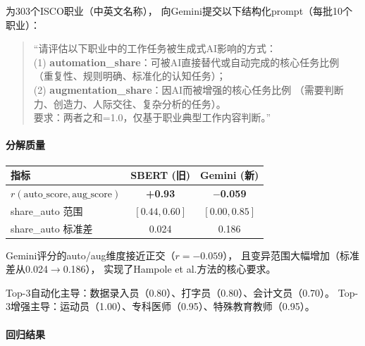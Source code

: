 \documentclass[12pt,a4paper]{ctexart}
\begin{document}
为303个ISCO职业（中英文名称），
向Gemini提交以下结构化prompt（每批10个职业）：

\begin{quote}
\small
``请评估以下职业中的工作任务被生成式AI影响的方式：\\
(1) \textbf{automation\_share}：可被AI直接替代或自动完成的核心任务比例
（重复性、规则明确、标准化的认知任务）；\\
(2) \textbf{augmentation\_share}：因AI而被增强的核心任务比例
（需要判断力、创造力、人际交往、复杂分析的任务）。\\
要求：两者之和=1.0，仅基于职业典型工作内容判断。''
\end{quote}

\paragraph{分解质量}

\begin{center}
\small
\begin{tabular}{lcc}
\toprule
指标 & SBERT (旧) & Gemini (新) \\
\midrule
$r(\text{auto\_score}, \text{aug\_score})$ & \textbf{+0.93} & \textbf{$-$0.059} \\
share\_auto 范围 & $[0.44, 0.60]$ & $[0.00, 0.85]$ \\
share\_auto 标准差 & 0.024 & 0.186 \\
\bottomrule
\end{tabular}
\end{center}

Gemini评分的auto/aug维度接近正交（$r=-0.059$），
且变异范围大幅增加（标准差从0.024$\to$0.186），
实现了Hampole et al.方法的核心要求。

Top-3自动化主导：数据录入员（0.80）、打字员（0.80）、会计文员（0.70）。
Top-3增强主导：运动员（1.00）、专科医师（0.95）、特殊教育教师（0.95）。

\paragraph{回归结果}
\end{document}
